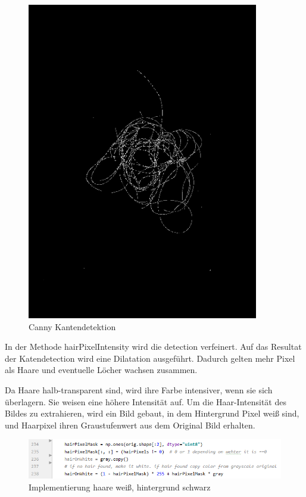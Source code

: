 \documentclass[german,a4paper,12pt]{llncs}
\begin{document}
\begin{figure}
	\centering
	\includegraphics[width=0.9\textwidth]{fig64/04edges.png}
	\caption[]{Canny Kantendetektion}
	\label{img:Crop}
\end{figure}

In der Methode hairPixelIntensity wird die detection verfeinert.
Auf das Resultat der Katendetection wird eine Dilatation ausgeführt. Dadurch gelten mehr Pixel als Haare und eventuelle Löcher wachsen zusammen.

Da Haare halb-transparent sind, wird ihre Farbe intensiver, wenn sie sich überlagern. Sie weisen eine höhere Intensität auf.
Um die Haar-Intensität des Bildes zu extrahieren, wird ein Bild gebaut, in dem Hintergrund Pixel weiß sind, und Haarpixel ihren Graustufenwert aus dem Original Bild erhalten.

\begin{figure}
	\centering
	\includegraphics[width=1.1\textwidth]{01quellc.PNG}
	\caption[]{Implementierung haare weiß, hintergrund schwarz}
	\label{img:Crop}
\end{figure}
\end{document}
